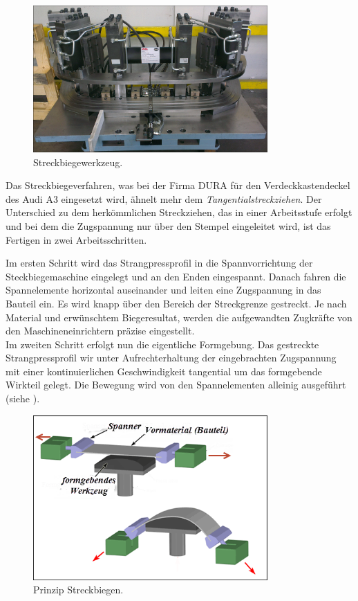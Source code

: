 \documentclass[12pt,a4paper,parskip,twoside,BCOR5mm,headsepline]{scrartcl}
\begin{document}
\begin{figure}[hbtp]
\centering
\includegraphics[width=0.8\textwidth]{steckbiegeeinheit}
\caption{Streckbiegewerkzeug.}
\label{fig:Streckbiegemaschine}
\end{figure}
Das Streckbiegeverfahren, was bei der Firma DURA  für den Verdeckkastendeckel des Audi A3 eingesetzt wird, ähnelt mehr dem \emph{Tangentialstreckziehen}. Der Unterschied zu dem herkömmlichen Streckziehen, das in einer Arbeitsstufe erfolgt und bei dem die Zugspannung nur über den Stempel eingeleitet wird, ist das Fertigen in zwei Arbeitsschritten.

 Im ersten Schritt wird das Strangpressprofil in die Spannvorrichtung der Steckbiegemaschine eingelegt und an den Enden eingespannt. Danach fahren die Spannelemente horizontal auseinander und leiten eine Zugspannung in das Bauteil ein. Es wird knapp über den Bereich der Streckgrenze gestreckt. Je nach Material und erwünschtem Biegeresultat, werden die aufgewandten Zugkräfte von den Maschineneinrichtern präzise eingestellt.\\
  Im zweiten Schritt erfolgt nun die eigentliche Formgebung. Das gestreckte Strangpressprofil wir unter Aufrechterhaltung der eingebrachten Zugspannung mit einer kontinuierlichen Geschwindigkeit tangential um das formgebende Wirkteil gelegt. Die Bewegung wird von den Spannelementen alleinig ausgeführt (siehe ).
  \begin{figure}[hbtp]
  \centering
  \includegraphics[width=0.8\textwidth]{streckbiegen}
  \caption[Prinzip Streckbiegen]{Prinzip Streckbiegen.\protect\footnotemark}
  \label{fig:streckbiegen} 
  \end{figure}
  
\end{document}
